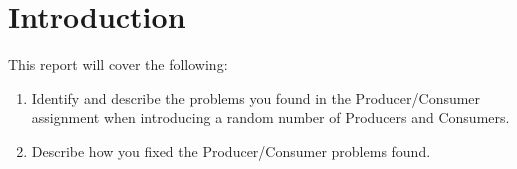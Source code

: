 \section{Introduction}
\label{section:intro}
This report will cover the following:
\begin{enumerate}
    \item Identify and describe the problems you found in the Producer/Consumer assignment when introducing a random number of Producers and Consumers.
    \item Describe how you fixed the Producer/Consumer problems found.
\end{enumerate}